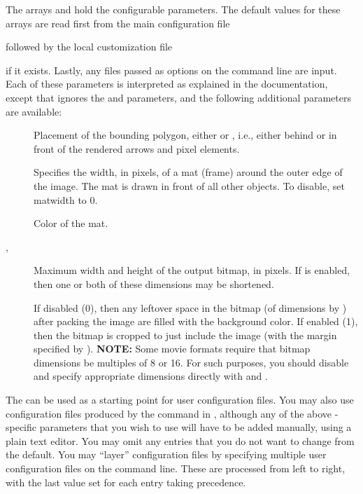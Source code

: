The arrays  and  hold the
configurable parameters.  The default values for these arrays are read
first from the main configuration file
\begin{quote}
\end{quote}
followed by the local customization file
\begin{quote}
\end{quote}
if it exists.  Lastly, any files passed as  options on the
command line are input.  Each of these parameters is interpreted as
explained in the 
documentation, except that  ignores the
 and 
parameters, and the following additional parameters are available:
\begin{description}
\item[]
 Placement of the bounding polygon, either  or ,
 i.e., either behind or in front of the rendered arrows and pixel
 elements.
\item[]
 Specifies the width, in pixels, of a mat (frame) around the outer edge
 of the image.  The mat is drawn in front of all other objects.  To
 disable, set matwidth to 0.
\item[]
 Color of the mat.
\item[, ]
 Maximum width and height of the output bitmap, in pixels.  If
  is enabled, then one or both of these dimensions may be
 shortened.
\item[]
 If disabled (0), then any leftover space in the bitmap (of dimensions
  by ) after packing the image are filled
 with the background color.  If enabled (1), then the bitmap is cropped
 to just include the image (with the margin specified by
 ).  {\bf NOTE:} Some movie formats require that
 bitmap dimensions be multiples of 8 or 16.  For such purposes, you
 should disable  and specify appropriate dimensions
 directly with  and .
\end{description}

The  can be used as a starting point for
user configuration files.  You may also use configuration files produced
by the  command in
, although any of the above
-specific parameters that you wish to use will have to be
added manually, using a plain text editor.  You may omit any entries
that you do not want to change from the default.  You may ``layer''
configuration files by specifying multiple user configuration files on
the command line.  These are processed from left to right, with the last
value set for each entry taking precedence.

